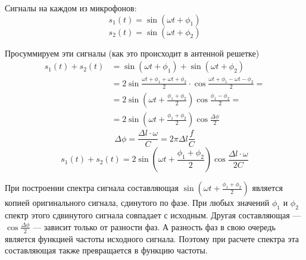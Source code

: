 \documentclass[fleqn,10pt,a4paper]{article}
\begin{document}
Сигналы на каждом из микрофонов:
\begin{equation*}
	s_1(t) = \sin\left(\omega{}t+\phi_1\right)
\end{equation*}
\begin{equation*}
	s_2(t) = \sin\left(\omega{}t+\phi_2\right)
\end{equation*}

Просуммируем эти сигналы (как это происходит в антенной решетке)
\begin{equation*}
	\begin{aligned}
		s_1(t) + s_2(t) &=
		\sin\left(\omega{}t+\phi_1\right)+\sin\left(\omega{}t+\phi_2\right) \\
		&= 2\sin\frac{\omega{}t+\phi_1+\omega{}t+\phi_2}{2}\cdot
		\cos\frac{\omega{}t+\phi_1-\omega{}t-\phi_2}{2} = \\
		&= 2\sin\left(\omega{}t+\frac{\phi_1+\phi_2}{2}\right)
		\cos\frac{\phi_1-\phi_2}{2} = \\
		&= 2\sin\left(\omega{}t+\frac{\phi_1+\phi_2}{2}\right)
		\cos\frac{\Delta\phi}{2}
	\end{aligned}
\end{equation*}
\begin{equation*}
	\Delta\phi=\frac{\Delta{}l\cdot\omega}{C}=2\pi\Delta{}l\frac{f}{C}
\end{equation*}
\begin{equation*}
	s_1(t) + s_2(t) = 2\sin\left(\omega{}t+\frac{\phi_1+\phi_2}{2}\right)
		\cos\frac{\Delta{}l\cdot\omega}{2C}
\end{equation*}

При построении спектра сигнала составляющая
$\sin\left(\omega{}t+\frac{\phi_1+\phi_2}{2}\right)$ является копией оригинального
сигнала, сдинутого по фазе. При любых значений $\phi_1$ и $\phi_2$ спектр этого
сдвинутого сигнала совпадает с исходным. Другая составляющая ---
$\cos\frac{\Delta\phi}{2}$ --- зависит только от разности фаз.
А разность фаз в свою очередь является функцией частоты исходного сигнала.
Поэтому при расчете спектра эта составляющая также  превращается в функцию
частоты.
\end{document}
